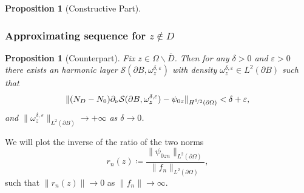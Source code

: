 \documentclass[10pt,xcolor={dvipsnames}]{beamer}
\newtheorem{proposition}[subsection]{Proposition}
\theoremstyle{plain}
\newtheorem{remark}[subsection]{Remark}
\theoremstyle{plain}
\let\epsilon\varepsilon
\begin{document}
\begin{frame}
\begin{proposition}[Constructive Part]
\begin{itemize}
\end{itemize}
\end{proposition}

\end{frame}
\begin{frame}
 \frametitle{Approximating sequence for $z\notin D$}
 \begin{proposition}[Counterpart]
\label{prop:lsm-counterpart}
Fix $z \in \Omega\backslash\overline{D}$. Then for any $\delta>0$ and $\epsilon > 0$ there exists an harmonic layer $\mathcal{S}(\partial B, \omega^{\delta, \epsilon}_z)$ with density $\omega^{\delta, \epsilon}_z\in L^2(\partial B)$ such that
\begin{equation}
 \|({N_D} - {N_0})\partial_\nu\mathcal{S}(\partial B, \omega^{\delta,\epsilon}_z) - \psi_{0z}\|_{H^{\nicefrac{1}{2}}(\partial\Omega)} < \delta + \epsilon,
\end{equation}
and $\|\omega^{\delta, \epsilon}_z\|_{L^2(\partial B)}\to + \infty$ as $\delta\to 0$.
\end{proposition}
We will plot the inverse of the ratio of the two norms
\begin{equation}
 r_n(z)\coloneqq\frac{\|\psi_{0zn}\|_{L^2(\partial \Omega)}}{\|f_n\|_{L^2(\partial \Omega)}},
\end{equation}
such that $\|r_n(z)\|\to 0$ as $\|f_n\|\to \infty$.

\end{frame}
\end{document}
